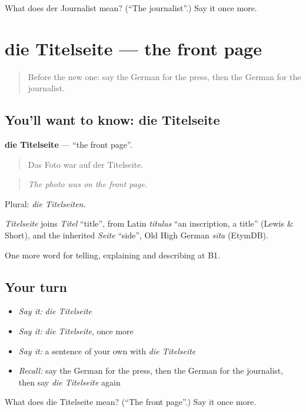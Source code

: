\begin{tcolorbox}[breakable,colback=teal!4,colframe=teal!35!black,title={Before you move on}]
What does der Journalist mean? (\textquotedblleft{}The journalist\textquotedblright{}.) Say it once more.
\end{tcolorbox}
\section[die Titelseite]{die Titelseite — the front page}

\label{lesson:GE-C272-titelseite}



\begin{quote}
Before the new one: say the German for the press, then the German for the journalist.
\end{quote}

\subsection*{You'll want to know: die Titelseite}
\textbf{die Titelseite} — \textquotedblleft{}the front page\textquotedblright{}.

\begin{quote}
Das Foto war auf der Titelseite.
\end{quote}

\begin{quote}
\emph{The photo was on the front page.}
\end{quote}

Plural: \emph{die Titelseiten}.

\begin{cousinweb}
\emph{Titelseite} joins \emph{Titel} \textquotedblleft{}title\textquotedblright{}, from Latin \emph{titulus} \textquotedblleft{}an inscription, a title\textquotedblright{} (Lewis \& Short), and the inherited \emph{Seite} \textquotedblleft{}side\textquotedblright{}, Old High German \emph{sīta} (EtymDB).
\end{cousinweb}

\begin{grammarlens}[title={What you've built}]
One more word for telling, explaining and describing at B1.
\end{grammarlens}

\subsection*{Your turn}
\begin{itemize}
\raggedright
  \item \emph{Say it:} \emph{die Titelseite}
  \item \emph{Say it:} \emph{die Titelseite}, once more
  \item \emph{Say it:} a sentence of your own with \emph{die Titelseite}
  \item \emph{Recall:} say the German for the press, then the German for the journalist, then say \emph{die Titelseite} again
\end{itemize}

\begin{tcolorbox}[breakable,colback=teal!4,colframe=teal!35!black,title={Before you move on}]
What does die Titelseite mean? (\textquotedblleft{}The front page\textquotedblright{}.) Say it once more.
\end{tcolorbox}
